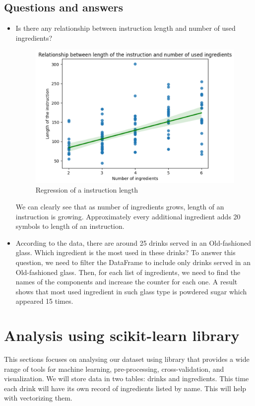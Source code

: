 \documentclass[a4paper]{article}
\begin{document}
\subsection{Questions and answers}
\begin{itemize}
    \item Is there any relationship between instruction length and number of used ingredients?
    \begin{figure}[H]
        \centering
        \includegraphics[width=0.75\linewidth]{instructionlen.png}
        \caption{Regression of a instruction length}
        \label{fig:enter-label}
    \end{figure}
    We can clearly see that as number of ingredients grows, length of an instruction is growing. Approximately every additional ingredient adds 20 symbols to length of an instruction.

    \item According to the data, there are around 25 drinks served in an Old-fashioned glass. Which ingredient is the most used in these drinks? To answer this question, we need to filter the DataFrame to include only drinks served in an Old-fashioned glass. Then, for each list of ingredients, we need to find the names of the components and increase the counter for each one. A result shows that most used ingredient in such glass type is powdered sugar which appeared 15 times.
\end{itemize}

\section{Analysis using scikit-learn library}
This sections focuses on analysing our dataset using library that provides a wide range of tools for machine learning, pre-processing, cross-validation, and visualization. We will store data in two tables: drinks and ingredients. This time each drink will have its own record of ingredients listed by name. This will help with vectorizing them.
\end{document}
